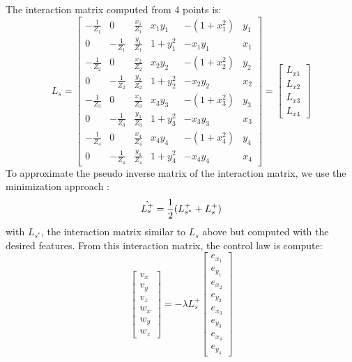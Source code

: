 The interaction matrix computed from 4 points is:
\[
L_s
=
\begin{bmatrix}
    - \frac{1}{Z_1} & 0 & \frac{x_1}{Z_1} & x_1 y_1 & -(1+x_1^2) & y_1 \\
    0 & - \frac{1}{Z_1} & \frac{y_1}{Z_1} & 1+y_1^2 & - x_1 y_1 & x_1  \\
    - \frac{1}{Z_2} & 0 & \frac{x_2}{Z_2} & x_2 y_2 & -(1+x_2^2) & y_2 \\
    0 & - \frac{1}{Z_2} & \frac{y_2}{Z_2} & 1+y_2^2 & - x_2 y_2 & x_2  \\
    - \frac{1}{Z_3} & 0 & \frac{x_3}{Z_3} & x_3 y_3 & -(1+x_3^2) & y_3 \\
    0 & - \frac{1}{Z_3} & \frac{y_3}{Z_3} & 1+y_3^2 & - x_3 y_3 & x_3  \\
    - \frac{1}{Z_4} & 0 & \frac{x_4}{Z_4} & x_4 y_4 & -(1+x_4^2) & y_4 \\
    0 & - \frac{1}{Z_4} & \frac{y_4}{Z_4} & 1+y_4^2 & - x_4 y_4 & x_4  
\end{bmatrix}
=
\begin{bmatrix}
    L_{x1} \\
    L_{x2} \\
    L_{x3} \\
    L_{x4} 
\end{bmatrix}
\]
To approximate the pseudo inverse matrix of the interaction matrix, we use the minimization approach :
\[
\Hat{L_s^+} = \frac{1}{2}(L_{s^*}^+ + L_s^+)
\]
with $L_{s^*}$, the interaction matrix similar to $L_s$ above but computed with the desired features.
From this interaction matrix, the control law is compute:
\begin{equation}
\begin{bmatrix}
    v_x \\
    v_y \\
    v_z \\
    w_x \\
    w_y \\
    w_z
\end{bmatrix}
= - \lambda L_{s}^+ 
\begin{bmatrix}
    e_{x_1} \\
    e_{y_1} \\
    e_{x_2} \\
    e_{y_2} \\
    e_{x_3} \\
    e_{y_3} \\
    e_{x_4} \\
    e_{y_4} 
\end{bmatrix}
\end{equation}
